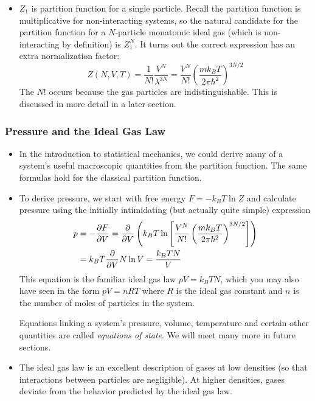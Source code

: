 \documentclass[11pt, a4paper]{article}
\begin{document}
\begin{itemize}
	\item $ Z_{1} $ is partition function for a single particle. Recall the partition function is multiplicative for non-interacting systems, so the natural candidate for the partition function for a $ N $-particle monatomic ideal gas (which is non-interacting by definition) is $ Z_{1}^{N} $. It turns out the correct expression has an extra normalization factor:
	\begin{equation*}
		Z(N, V, T) = \frac{1}{N!}\frac{V^{N}}{\lambda^{3N}} = \frac{V^{N}}{N!} \left(\frac{mk_{B}T}{2\pi \hbar^{2}}\right)^{3N/2}
	\end{equation*}
	The $ N! $ occurs because the gas particles are indistinguishable. This is discussed in more detail in a later section.
	
\end{itemize}

\subsubsection{Pressure and the Ideal Gas Law}
\begin{itemize}
	\item In the introduction to statistical mechanics, we could derive many of a system's useful macroscopic quantities from the partition function. The same formulas hold for the classical partition function.
	
	\item To derive pressure, we start with free energy $ F = - k_{B}T \ln Z $ and calculate pressure using the initially intimidating (but actually quite simple) expression
	\begin{align*}
		p &= -\pdv{F}{V} = \pdv{}{V}\left( k_{B}T \ln\left [\frac{V^{N}}{N!} \left(\frac{mk_{B}T}{2\pi \hbar^{2}}\right)^{3N/2}\right ]\right)  \\
		&= k_{B} T\pdv{}{V} N \ln V = \frac{k_{B}T N}{V}
	\end{align*}
	This equation is the familiar ideal gas law $ pV = k_{B}T N $, which you may also have seen in the form $ pV = nRT $ where $ R $ is the ideal gas constant and $ n $ is the number of moles of particles in the system.
	
	Equations linking a system's pressure, volume, temperature and certain other quantities are called \textit{equations of state}. We will meet many more in future sections.
	
	\item The ideal gas law is an excellent description of gases at low densities (so that interactions between particles are negligible). At higher densities, gases deviate from the behavior predicted by the ideal gas law.
\end{itemize}
\end{document}
